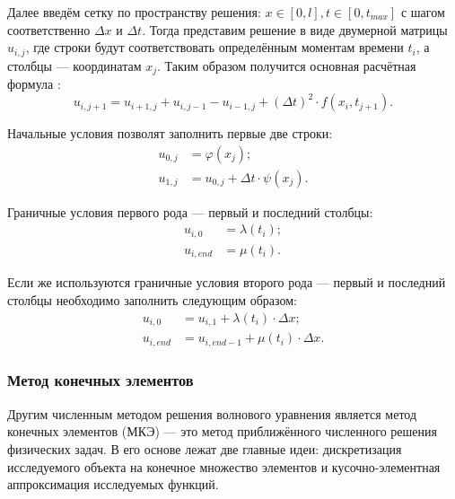 \documentclass[12pt,a4paper,russian]{report}
\begin{document}
	Далее введём сетку по пространству решения: $ x \in [0, l], t \in [0, t_{max}]$ с шагом соответственно $\Delta x$ и $\Delta t$. Тогда представим решение в виде двумерной матрицы $u_{i,j}$, где строки будут соответствовать определённым моментам времени $t_i$, а столбцы --- координатам $x_j$. Таким образом получится основная расчётная формула \cite{Samarski_SetochMethods}:
	\begin{equation} \label{eq:MKR_main_foumula}
		u_{i, j + 1} = u_{i + 1, j} + u_{i, j - 1} - u_{i - 1, j} + \left( \Delta t \right)^2 \cdot f(x_i, t_{j + 1}).
	\end{equation}
	
	Начальные условия позволят заполнить первые две строки:
	\begin{equation*}
		\begin{split}
			u_{0,j} & =  \varphi (x_j); \\
			u_{1, j} & = u_{0,j} + \Delta t \cdot \psi (x_j).
		\end{split}
	\end{equation*}

	Граничные условия первого рода --- первый и последний столбцы:
	\begin{equation*}
		\begin{split}
			u_{i,0} & = \lambda (t_i); \\
			u_{i, end} & = \mu (t_i).
		\end{split}
	\end{equation*}
	
	Если же используются граничные условия второго рода --- первый и последний столбцы необходимо заполнить следующим образом:
	\begin{equation*}
		\begin{split}
			u_{i, 0} & = u_{i, 1} + \lambda (t_i) \cdot \Delta x; \\
			u_{i, end} & = u_{i, end-1} + \mu (t_i)\cdot \Delta x.
		\end{split}
	\end{equation*}
	
	
	\subsubsection{Метод конечных элементов}
	
	Другим численным методом решения волнового уравнения является метод конечных элементов  (МКЭ) --- это метод приближённого численного решения физических задач. В его основе лежат две главные идеи: дискретизация исследуемого объекта на конечное множество элементов и кусочно-элементная аппроксимация исследуемых функций.
	
\end{document}
